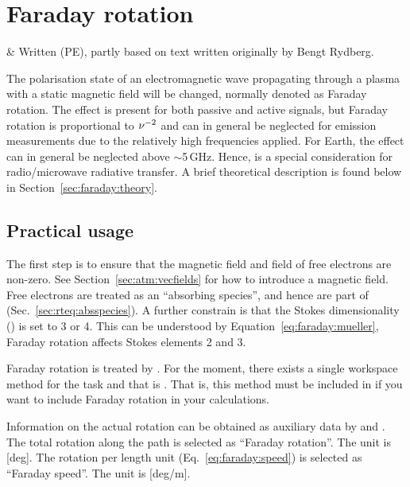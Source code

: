 \chapter{Faraday rotation}
 \label{sec:faraday}

 & Written (PE), partly based on text written originally by 
          Bengt Rydberg.
\stophistory

The polarisation state of an electromagnetic wave propagating through a plasma
with a static magnetic field will be changed, normally denoted as Faraday
rotation. The effect is present for both passive and active signals, but
Faraday rotation is proportional to $\nu^{-2}$ and can in general be neglected
for emission measurements due to the relatively high frequencies applied. For
Earth, the effect can in general be neglected above
$\sim$5\,GHz. Hence,  is a special consideration
for radio/microwave radiative transfer. A brief theoretical description is
found below in Section~\ref{sec:faraday:theory}. 



\section{Practical usage}
\label{sec:faraday:arts}
%
The first step is to ensure that the magnetic field and field of free electrons
are non-zero. See Section~\ref{sec:atm:vecfields} for how to introduce a
magnetic field. Free electrons are treated as an ``absorbing species'', and
hence are part of  (Sec.~\ref{sec:rteq:absspecies}). A
further constrain is that the Stokes dimensionality () is
set to 3 or 4. This can be understood by Equation~\ref{eq:faraday:mueller},
Faraday rotation affects Stokes elements 2 and 3.

Faraday rotation is treated by . For the
moment, there exists a single workspace method for the task and that is
. That is, this method must be included
in  if you want to include Faraday
rotation in your calculations.

Information on the actual rotation can be obtained as auxiliary data by
 and . The total
rotation along the path is selected as ``Faraday rotation''. The unit is [deg].
The rotation per length unit (Eq.~\ref{eq:faraday:speed}) is selected as
``Faraday speed''. The unit is [deg/m].




